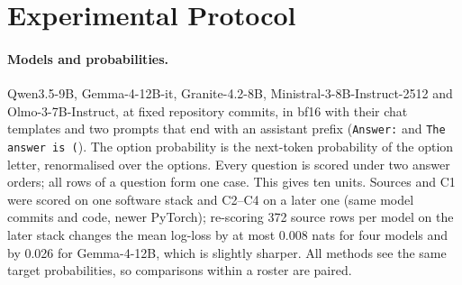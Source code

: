 \documentclass[runningheads]{llncs}
\begin{document}
\section{Experimental Protocol}\label{sec:protocol}
\paragraph{Models and probabilities.}
Qwen3.5-9B, Gemma-4-12B-it, Granite-4.2-8B, Ministral-3-8B-Instruct-2512 and Olmo-3-7B-Instruct, at fixed repository commits, in bf16 with their chat templates and two prompts that end with an assistant prefix (\texttt{Answer:} and \texttt{The answer is (}).
The option probability is the next-token probability of the option letter, renormalised over the options.
Every question is scored under two answer orders; all rows of a question form one case.
This gives ten units.
Sources and C1 were scored on one software stack and C2--C4 on a later one (same model commits and code, newer PyTorch); re-scoring 372 source rows per model on the later stack changes the mean log-loss by at most 0.008 nats for four models and by 0.026 for Gemma-4-12B, which is slightly sharper.
All methods see the same target probabilities, so comparisons within a roster are paired.
\end{document}
